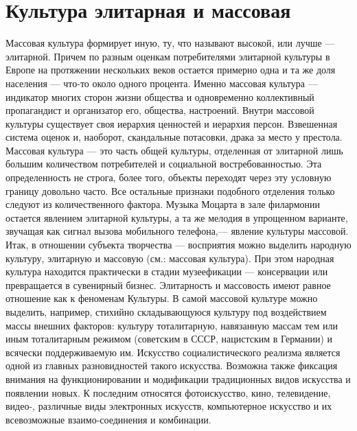 \documentclass[12pt]{article}
\begin{document}
\newpage
\section{Культура элитарная и массовая}
Массовая культура формирует иную, ту, что называют высокой, или лучше — элитарной. Причем по разным
оценкам потребителями элитарной культуры в Европе на протяжении нескольких веков остается примерно одна
и та же доля населения — что-то около одного процента. Именно массовая культура — индикатор многих
сторон жизни общества и одновременно коллективный пропагандист и организатор его, общества, настроений.
Внутри  массовой  культуры  существует  своя  иерархия  ценностей  и  иерархия  персон.  Взвешенная  система
оценок и, наоборот, скандальные потасовки, драка за место у престола.
Массовая  культура  —  это  часть  общей  культуры,  отделенная  от  элитарной  лишь  большим  количеством
потребителей и социальной востребованностью. Эта определенность не строга, более того, объекты переходят
через эту условную границу довольно часто. Все остальные признаки подобного отделения только следуют из
количественного фактора.
Музыка Моцарта в зале филармонии остается явлением элитарной культуры, а та же мелодия в упрощенном
варианте, звучащая как сигнал вызова мобильного телефона,— явление культуры массовой.
Итак,  в  отношении  субъекта  творчества  ---  восприятия  можно  выделить  народную  культуру,  элитарную  и
массовую (см.: массовая культура). При этом народная культура находится практически в стадии музеефикации
--- консервации или превращается в сувенирный бизнес.
Элитарность и массовость имеют равное отношение как к феноменам Культуры. В самой массовой культуре
можно выделить, например, стихийно складывающуюся культуру под воздействием массы внешних факторов:
культуру  тоталитарную,  навязанную  массам  тем  или  иным  тоталитарным  режимом  (советским  в  СССР,
нацистским в Германии) и всячески поддерживаемую им. Искусство социалистического реализма является
одной из главных разновидностей такого искусства.
Возможна также фиксация внимания на функционировании и модификации традиционных видов искусства и
появлении  новых.  К  последним  относятся  фотоискусство,  кино,  телевидение,  видео-,  различные  виды
электронных искусств, компьютерное искусство и их всевозможные взаимо-соединения и комбинации. 

\newpage
\end{document}
